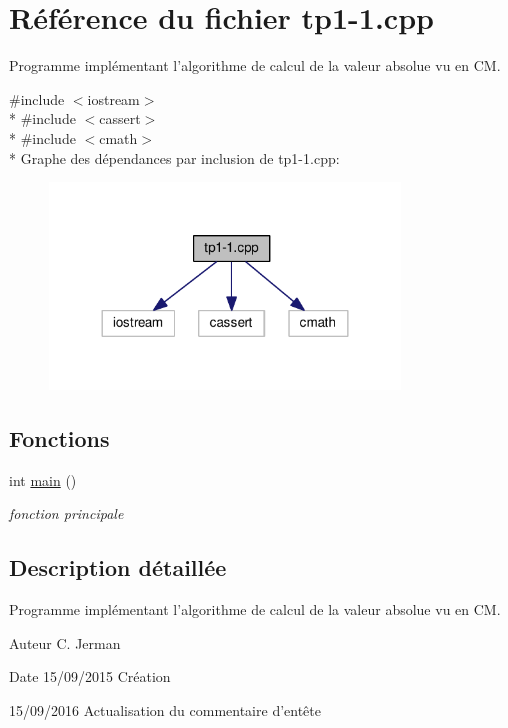 \hypertarget{tp1-1_8cpp}{\section{Référence du fichier tp1-\/1.cpp}
\label{tp1-1_8cpp}
}


Programme implémentant l'algorithme de calcul de la valeur absolue vu en C\+M.  


{\ttfamily \#include $<$iostream$>$}\\*
{\ttfamily \#include $<$cassert$>$}\\*
{\ttfamily \#include $<$cmath$>$}\\*
Graphe des dépendances par inclusion de tp1-\/1.cpp\+:\nopagebreak
\begin{figure}[H]
\begin{center}
\leavevmode
\includegraphics[width=264pt]{tp1-1_8cpp__incl}
\end{center}
\end{figure}
\subsection*{Fonctions}
\begin{DoxyCompactItemize}
\item 
int \hyperlink{tp1-1_8cpp_ae66f6b31b5ad750f1fe042a706a4e3d4}{main} ()
\begin{DoxyCompactList}\small\item\em fonction principale \end{DoxyCompactList}\end{DoxyCompactItemize}


\subsection{Description détaillée}
Programme implémentant l'algorithme de calcul de la valeur absolue vu en C\+M. 

\begin{DoxyAuthor}{Auteur}
C. Jerman 
\end{DoxyAuthor}
\begin{DoxyDate}{Date}
15/09/2015 Création 

15/09/2016 Actualisation du commentaire d'entête 
\end{DoxyDate}


